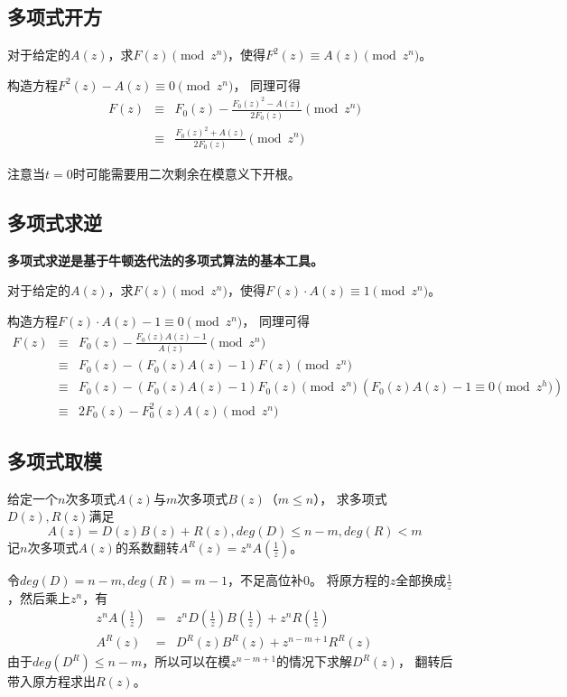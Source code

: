 \subsection{多项式开方}
对于给定的$A(z)$，求$F(z) \pmod{z^n}$，使得$F^2(z)\equiv A(z)\pmod{z^n}$。

构造方程$F^2(z)-A(z)\equiv 0\pmod{z^n}$，
同理可得
\begin{eqnarray*}
    F(z)&\equiv& F_0(z)-\frac{F_0(z)^2-A(z)}{2F_0(z)} \pmod{z^n}\\
    &\equiv& \frac{F_0(z)^2+A(z)}{2F_0(z)} \pmod{z^n}
\end{eqnarray*}

注意当$t=0$时可能需要用二次剩余在模意义下开根。

\subsection{多项式求逆}
{\bfseries 多项式求逆是基于牛顿迭代法的多项式算法的基本工具。}

对于给定的$A(z)$，求$F(z) \pmod{z^n}$，使得$F(z)\cdot A(z)\equiv 1\pmod{z^n}$。

构造方程$F(z)\cdot A(z)-1\equiv 0\pmod{z^n}$，
同理可得
\begin{eqnarray*}
    F(z)&\equiv& F_0(z)-\frac{F_0(z)A(z)-1}{A(z)} \pmod{z^n}\\
    &\equiv& F_0(z)-(F_0(z)A(z)-1){F(z)} \pmod{z^n}\\
    &\equiv& F_0(z)-(F_0(z)A(z)-1){F_0(z)} \pmod{z^n}~(F_0(z)A(z)-1\equiv 0\pmod{z^h})\\
    &\equiv& 2F_0(z)-F_0^2(z)A(z) \pmod{z^n}
\end{eqnarray*}
\subsection{多项式取模}
给定一个$n$次多项式$A(z)$与$m$次多项式$B(z)$（$m\leq n$），
求多项式$D(z),R(z)$满足
\begin{displaymath}
    A(z)=D(z)B(z)+R(z),deg(D)\leq n-m,deg(R)<m
\end{displaymath}
记$n$次多项式$A(z)$的系数翻转$A^R(z)=z^nA(\frac{1}{z})$。

令$deg(D)=n-m,deg(R)=m-1$，不足高位补0。
将原方程的$z$全部换成$\frac{1}{z}$，然后乘上$z^n$，有
\begin{eqnarray*}
    z^nA(\frac{1}{z})&=&z^nD(\frac{1}{z})B(\frac{1}{z})+z^nR(\frac{1}{z})\\
    A^R(z)&=&D^R(z)B^R(z)+z^{n-m+1}R^R(z)
\end{eqnarray*}
由于$deg(D^R)\leq n-m$，所以可以在模$z^{n-m+1}$的情况下求解$D^R(z)$，
翻转后带入原方程求出$R(z)$。

